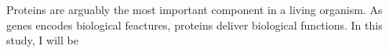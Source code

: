 Proteins are arguably the most important component in a living organism. As genes encodes biological feactures, proteins deliver biological functions.    In this study, I will be 